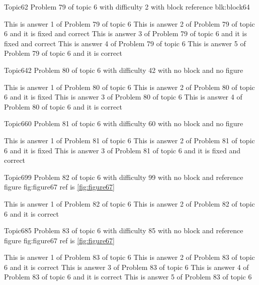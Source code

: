 \documentclass[master]{exam}
\begin{document}
\begin{problem}[requires=blk:block64]{Topic6}{2}
	Problem 79 of topic 6 with difficulty 2 with block reference blk:block64
	\begin{answers}
		\answer This is answer 1 of Problem 79 of topic 6 
		 This is answer 2 of Problem 79 of topic 6 and it is fixed and correct
		 This is answer 3 of Problem 79 of topic 6 and it is fixed and correct
		\answer This is answer 4 of Problem 79 of topic 6 
		\answer[correct] This is answer 5 of Problem 79 of topic 6 and it is correct
	\end{answers}
\end{problem}

\begin{problem}{Topic6}{42}
	Problem 80 of topic 6 with difficulty 42 with no block and no figure
	\begin{answers}
		\answer This is answer 1 of Problem 80 of topic 6 
		\answer[fixed] This is answer 2 of Problem 80 of topic 6 and it is fixed
		\answer This is answer 3 of Problem 80 of topic 6 
		\answer[correct] This is answer 4 of Problem 80 of topic 6 and it is correct
	\end{answers}
\end{problem}

\begin{problem}{Topic6}{60}
	Problem 81 of topic 6 with difficulty 60 with no block and no figure
	\begin{answers}
		\answer This is answer 1 of Problem 81 of topic 6 
		\answer[fixed] This is answer 2 of Problem 81 of topic 6 and it is fixed
		 This is answer 3 of Problem 81 of topic 6 and it is fixed and correct
	\end{answers}
\end{problem}

\begin{problem}{Topic6}{99}
	Problem 82 of topic 6 with difficulty 99 with no block and reference figure fig:figure67 ref is \ref{fig:figure67}
	\begin{answers}
		\answer This is answer 1 of Problem 82 of topic 6 
		\answer[correct] This is answer 2 of Problem 82 of topic 6 and it is correct
	\end{answers}
\end{problem}

\begin{problem}{Topic6}{85}
	Problem 83 of topic 6 with difficulty 85 with no block and reference figure fig:figure67 ref is \ref{fig:figure67}
	\begin{answers}
		\answer This is answer 1 of Problem 83 of topic 6 
		\answer[correct] This is answer 2 of Problem 83 of topic 6 and it is correct
		\answer This is answer 3 of Problem 83 of topic 6 
		\answer[correct] This is answer 4 of Problem 83 of topic 6 and it is correct
		\answer This is answer 5 of Problem 83 of topic 6 
	\end{answers}
\end{problem}
\end{document}
